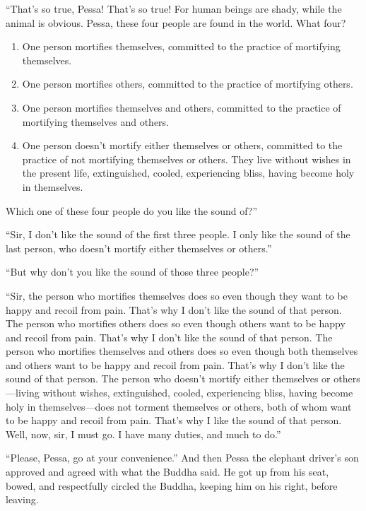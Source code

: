 \documentclass[12pt,openany]{book}%
\begin{document}
“That’s so true, Pessa! That’s so true! For human beings are shady, while the animal is obvious. Pessa, these four people are found in the world. What four? 

\begin{enumerate}%
\item One person mortifies themselves, committed to the practice of mortifying themselves. %
\item One person mortifies others, committed to the practice of mortifying others. %
\item One person mortifies themselves and others, committed to the practice of mortifying themselves and others. %
\item One person doesn’t mortify either themselves or others, committed to the practice of not mortifying themselves or others. They live without wishes in the present life, extinguished, cooled, experiencing bliss, having become holy in themselves. %
\end{enumerate}

Which one of these four people do you like the sound of?” 

“Sir, I don’t like the sound of the first three people. I only like the sound of the last person, who doesn’t mortify either themselves or others.” 

“But why don’t you like the sound of those three people?” 

“Sir, the person who mortifies themselves does so even though they want to be happy and recoil from pain. That’s why I don’t like the sound of that person. The person who mortifies others does so even though others want to be happy and recoil from pain. That’s why I don’t like the sound of that person. The person who mortifies themselves and others does so even though both themselves and others want to be happy and recoil from pain. That’s why I don’t like the sound of that person. The person who doesn’t mortify either themselves or others—living without wishes, extinguished, cooled, experiencing bliss, having become holy in themselves—does not torment themselves or others, both of whom want to be happy and recoil from pain. That’s why I like the sound of that person. Well, now, sir, I must go. I have many duties, and much to do.” 

“Please, Pessa, go at your convenience.” And then Pessa the elephant driver’s son approved and agreed with what the Buddha said. He got up from his seat, bowed, and respectfully circled the Buddha, keeping him on his right, before leaving. 
\end{document}
